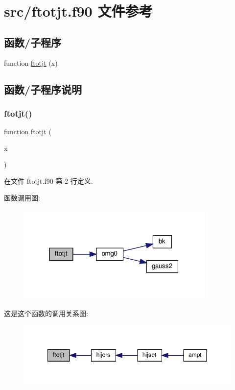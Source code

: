 \hypertarget{ftotjt_8f90}{}\section{src/ftotjt.f90 文件参考}
\label{ftotjt_8f90}
\subsection*{函数/子程序}
\begin{DoxyCompactItemize}
\item 
function \mbox{\hyperlink{ftotjt_8f90_a012044ce68aecf94d02bce124dded348}{ftotjt}} (x)
\end{DoxyCompactItemize}


\subsection{函数/子程序说明}
\mbox{\label{ftotjt_8f90_a012044ce68aecf94d02bce124dded348}} 
\subsubsection{\texorpdfstring{ftotjt()}{ftotjt()}}
{\footnotesize\ttfamily function ftotjt (\begin{DoxyParamCaption}\item[{}]{x }\end{DoxyParamCaption})}



在文件 ftotjt.\+f90 第 2 行定义.

函数调用图\+:
\nopagebreak
\begin{figure}[H]
\begin{center}
\leavevmode
\includegraphics[width=277pt]{ftotjt_8f90_a012044ce68aecf94d02bce124dded348_cgraph}
\end{center}
\end{figure}
这是这个函数的调用关系图\+:
\nopagebreak
\begin{figure}[H]
\begin{center}
\leavevmode
\includegraphics[width=342pt]{ftotjt_8f90_a012044ce68aecf94d02bce124dded348_icgraph}
\end{center}
\end{figure}

